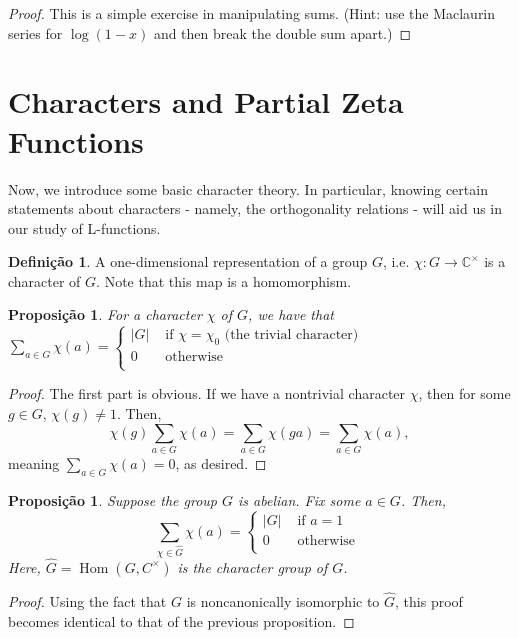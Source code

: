 \documentclass{article}
\DeclareMathOperator{\Hom}{Hom}
\newcommand{\CC}{\mathbb{C}}
\theoremstyle{plain}
\newtheorem{prop}[thm]{Proposição}
\theoremstyle{definition}
\newtheorem{defn}[thm]{Definição}
\theoremstyle{remark}
\numberwithin{equation}{section}
\numberwithin{thm}{section}
\begin{document}
\begin{proof}
This is a simple exercise in manipulating sums. (Hint: use the Maclaurin series for $\log(1-x)$ and then break the double sum apart.)
\end{proof}


\section{Characters and Partial Zeta Functions}

Now, we introduce some basic character theory. In particular, knowing certain statements about characters - namely, the orthogonality relations - will aid us in our study of L-functions.

\begin{defn}
A one-dimensional representation of a group $G$, i.e. $\chi: G \longrightarrow \CC^{\times}$ is a character of $G$. Note that this map is a homomorphism.
\end{defn}

\begin{prop} \label{3.2}
For a character $\chi$ of $G$, we have that $\sum_{a \in G} \chi(a) = \begin{cases}
|G| & \text{ if } \chi = \chi_{0} \text{ (the trivial character)} \\
0 &  \text { otherwise } \\
\end{cases}$  

\end{prop}

\begin{proof}
The first part is obvious. If we have a nontrivial character $\chi$, then for some $g \in G$, $\chi(g) \neq 1$. Then, $$\chi(g)\sum_{a \in G} \chi(a) = \sum_{a \in G} \chi(ga) = \sum_{a \in G} \chi(a),$$ meaning $\sum_{a \in G} \chi(a) = 0$, as desired. 
\end{proof}

\begin{prop} \label{3.3}
Suppose the group $G$ is abelian. Fix some $a \in G$. Then, $$\sum_{\chi \in \hat{G}} \chi(a) = \begin{cases}
|G| & \text{ if } a = 1 \\
0 & \text { otherwise } \\
\end{cases}$$ Here, $\hat{G} = \Hom(G, C^{\times})$ is the character group of $G$. 
\end{prop}

\begin{proof}
Using the fact that $G$ is noncanonically isomorphic to $\hat{G}$, this proof becomes identical to that of the previous proposition. 
\end{proof}
\end{document}
